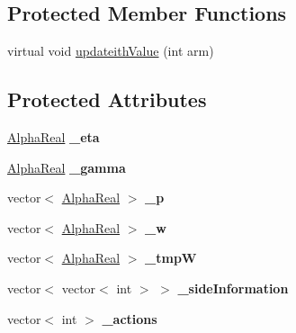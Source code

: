 \subsection*{Protected Member Functions}
\begin{DoxyCompactItemize}
\item 
virtual void \hyperlink{classMultiBoost_1_1Exp3G_a5ba701c52290894791ff2fcc685df3a3}{updateith\-Value} (int arm)
\end{DoxyCompactItemize}
\subsection*{Protected Attributes}
\begin{DoxyCompactItemize}
\item 
\hypertarget{classMultiBoost_1_1Exp3G_a1016293c08d529acdc668b1cc561cdbe}{\hyperlink{Defaults_8h_a80184c4fd10ab70a1a17c5f97dcd1563}{Alpha\-Real} {\bfseries \-\_\-eta}}\label{classMultiBoost_1_1Exp3G_a1016293c08d529acdc668b1cc561cdbe}

\item 
\hypertarget{classMultiBoost_1_1Exp3G_aea41c6a32ee98a9147c984e6dde58576}{\hyperlink{Defaults_8h_a80184c4fd10ab70a1a17c5f97dcd1563}{Alpha\-Real} {\bfseries \-\_\-gamma}}\label{classMultiBoost_1_1Exp3G_aea41c6a32ee98a9147c984e6dde58576}

\item 
\hypertarget{classMultiBoost_1_1Exp3G_a158e69f5bee912c7ad88a975985724c4}{vector$<$ \hyperlink{Defaults_8h_a80184c4fd10ab70a1a17c5f97dcd1563}{Alpha\-Real} $>$ {\bfseries \-\_\-p}}\label{classMultiBoost_1_1Exp3G_a158e69f5bee912c7ad88a975985724c4}

\item 
\hypertarget{classMultiBoost_1_1Exp3G_a6e0a3f4005860529a1c20f6ee7df6d3f}{vector$<$ \hyperlink{Defaults_8h_a80184c4fd10ab70a1a17c5f97dcd1563}{Alpha\-Real} $>$ {\bfseries \-\_\-w}}\label{classMultiBoost_1_1Exp3G_a6e0a3f4005860529a1c20f6ee7df6d3f}

\item 
\hypertarget{classMultiBoost_1_1Exp3G_a9c05071ae0532479245e9fbde05ca737}{vector$<$ \hyperlink{Defaults_8h_a80184c4fd10ab70a1a17c5f97dcd1563}{Alpha\-Real} $>$ {\bfseries \-\_\-tmp\-W}}\label{classMultiBoost_1_1Exp3G_a9c05071ae0532479245e9fbde05ca737}

\item 
\hypertarget{classMultiBoost_1_1Exp3G_af88e086d17fc20a767430257557c02b8}{vector$<$ vector$<$ int $>$ $>$ {\bfseries \-\_\-side\-Information}}\label{classMultiBoost_1_1Exp3G_af88e086d17fc20a767430257557c02b8}

\item 
\hypertarget{classMultiBoost_1_1Exp3G_af5ff69cc560d458e5ad9c68fa7d86d37}{vector$<$ int $>$ {\bfseries \-\_\-actions}}\label{classMultiBoost_1_1Exp3G_af5ff69cc560d458e5ad9c68fa7d86d37}

\end{DoxyCompactItemize}
